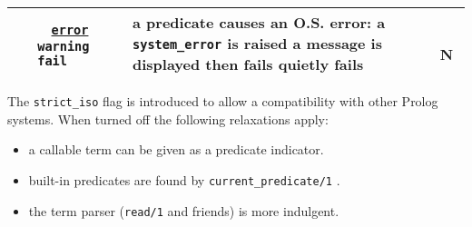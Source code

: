 \begin{tabular}{|L{4.5cm}|C{2.8cm}|L{6.2cm}|C{0,6cm}|}
\hline

~
\linebreak
{} &
  ~
\linebreak
  \texttt{\underline{error}}
\linebreak
  \texttt{warning}
\linebreak
  \texttt{fail} &
    a predicate causes an O.S. error:
\linebreak
    a \texttt{system\_error} is raised
\linebreak
    a message is displayed then fails
\linebreak
    quietly fails &
      ~
\linebreak
      N \\

\hline
\end{tabular}

The \texttt{strict\_iso} flag is introduced to allow a compatibility with
other Prolog systems. When turned off the following relaxations apply:

\begin{itemize}

\item a callable term can be given as a predicate indicator.

\item built-in predicates are found by \texttt{current\_predicate/1}
.

\item the term parser (\texttt{read/1} and friends) is more indulgent.

\end{itemize}

\begin{PlErrors}







\end{PlErrors}

